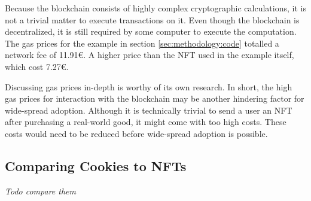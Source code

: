 Because the blockchain consists of highly complex cryptographic calculations, it is not a trivial matter to execute transactions on it. Even though the blockchain is decentralized, it is still required by some computer to execute the computation. The gas prices for the example in section \ref{sec:methodology:code} totalled a network fee of 11.91€. A higher price than the NFT used in the example itself, which cost 7.27€.

Discussing gas prices in-depth is worthy of its own research. In short, the high gas prices for interaction with the blockchain may be another hindering factor for wide-spread adoption. Although it is technically trivial to send a user an NFT after purchasing a real-world good, it might come with too high costs. These costs would need to be reduced before wide-spread adoption is possible.



%
%
\subsection{Comparing Cookies to NFTs}
\label{sub:results:comparison}
\textit{\color{red}Todo compare them}






